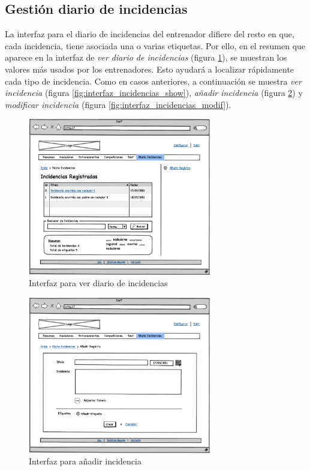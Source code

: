 	\subsection{Gestión diario de incidencias} %
		\label{sub:interfaz_gestion_diario_de_incidencias}
	
	La interfaz para el diario de incidencias del entrenador difiere del resto en que, cada incidencia, tiene asociada una o varias etiquetas. Por ello, en el resumen que aparece en la interfaz de {\it ver diario de incidencias} (figura \ref{fig:interfaz_incidencias}), se muestran los valores más usados por los entrenadores. Esto ayudará a localizar rápidamente cada tipo de incidencia. Como en casos anteriores, a continuación se muestra {\it ver incidencia} (figura \ref{fig:interfaz_incidencias_show}), {\it añadir incidencia} (figura \ref{fig:interfaz_incidencias_new}) y {\it modificar incidencia} (figura \ref{fig:interfaz_incidencias_modif}).
	
		\begin{figure}[H]
		  \centering
		    \includegraphics[width=8cm]{./eps/p_interfaz/22_Diario.eps}
		  \caption{Interfaz para ver diario de incidencias}
		  \label{fig:interfaz_incidencias}
		\end{figure}

		\begin{figure}[H]
		  \centering
		    \includegraphics[width=8cm]{./eps/p_interfaz/23_Diario_new.eps}
		  \caption{Interfaz para añadir incidencia}
		  \label{fig:interfaz_incidencias_new}
		\end{figure}
		
